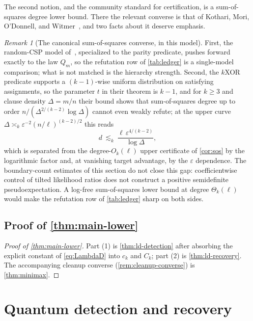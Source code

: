 \documentclass[11pt]{article}
\theoremstyle{definition}
\theoremstyle{remark}
\newtheorem{remark}[remark]{Remark}
\newcommand{\1}{\mathbf 1}
\newcommand{\eps}{\varepsilon}
\numberwithin{equation}{section}
\begin{document}
The second notion, and the community standard for certification, is a
sum-of-squares degree lower bound.  There the relevant converse is that
of Kothari, Mori, O'Donnell, and Witmer~\cite{KMOW}, and two facts about
it deserve emphasis.

\begin{remark}[The canonical sum-of-squares converse, in this model]
\label{rem:kmow}
First, the random-CSP model of~\cite{KMOW}, specialized to the parity
predicate, pushes forward exactly to the law $Q_m$, so the refutation
row of \cref{tab:ledger} is a single-model comparison; what is not
matched is the hierarchy strength.  Second, the $k$XOR predicate
supports a $(k-1)$-wise uniform distribution on satisfying assignments,
so the parameter $t$ in their theorem is $k-1$, and for $k\ge3$ and
clause density $\Delta=m/n$ their bound shows that sum-of-squares
degree up to order $n/(\Delta^{2/(k-2)}\log\Delta)$ cannot even weakly
refute; at the upper curve
$\Delta\asymp_k\eps^{-2}(n/\ell)^{(k-2)/2}$ this reads
\[
 d\ \lesssim_k\ \frac{\ell\,\eps^{4/(k-2)}}{\log\Delta},
\]
which is separated from the degree-$O_k(\ell)$ upper certificate of
\cref{cor:sos} by the logarithmic factor and, at vanishing target
advantage, by the $\eps$ dependence.  The boundary-count estimates of
this section do not close this gap: coefficientwise control of tilted
likelihood ratios does not construct a positive semidefinite
pseudoexpectation.  A log-free sum-of-squares lower bound at
degree $\Theta_k(\ell)$ would make the refutation row of
\cref{tab:ledger} sharp on both sides.
\end{remark}

\subsection{Proof of \texorpdfstring{\cref{thm:main-lower}}{the lower-bound theorem}}

\begin{proof}[Proof of \cref{thm:main-lower}]
Part (1) is \cref{thm:ld-detection} after absorbing the explicit
constant of \cref{eq:LambdaD} into $c_k$ and $C_k$; part (2) is
\cref{thm:ld-recovery}.  The accompanying cleanup converse
(\cref{rem:cleanup-converse}) is \cref{thm:minimax}.
\end{proof}

\section{Quantum detection and recovery}\label{sec:quantum}
\end{document}
